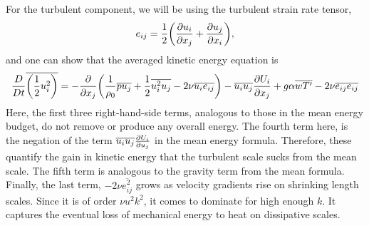 \documentclass[10pt]{article}
\begin{document}
For the turbulent component, we will be using the turbulent strain rate tensor,
\begin{align}
    e_{ij} = \frac{1}{2}\qty(\pdv{u_i}{x_j} + \pdv{u_j}{x_i}),
\end{align}
and one can show that the averaged kinetic energy equation is
\begin{align}
    \frac{D}{Dt}\overline{\qty(\frac{1}{2}u_i^2)} = -\pdv{x_j}\qty(\frac{1}{\rho_0}\overline{pu_j} + \frac{1}{2}\overline{u_i^2u_j} - 2\nu\overline{u_ie_{ij}}) - \overline{u_iu_j}\pdv{U_i}{x_j} + g\alpha\overline{wT'} - 2\nu\overline{e_{ij}e_{ij}}
\end{align}
Here, the first three right-hand-side terms, analogous to those in the mean energy budget, do not remove or produce any overall energy. The fourth term here, is the negation of the term $\overline{u_iu_j}\pdv{U_i}{u_j}$ in the mean energy formula. Therefore, these quantify the gain in kinetic energy that the turbulent scale sucks from the mean scale. The fifth term is analogous to the gravity term from the mean formula. Finally, the last term, $-2\nu\overline{e_{ij}^2}$ grows as velocity gradients rise on shrinking length scales. Since it is of order $\nu u^2k^2$, it comes to dominate for high enough $k$. It captures the eventual loss of mechanical energy to heat on dissipative scales.
\end{document}
